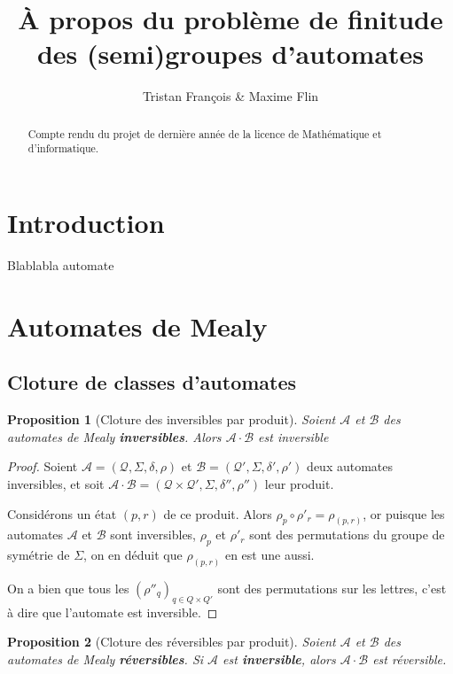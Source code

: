 \documentclass{article}
\title{À propos du problème de finitude des (semi)groupes d'automates}
\author{Tristan François \& Maxime Flin}
\newtheorem{prop}{Proposition}
\begin{document}
\maketitle

\begin{abstract}
  Compte rendu du projet de dernière année de la licence de Mathématique et d'informatique.
\end{abstract}


\section*{Introduction}
Blablabla automate

\section{Automates de Mealy}

\subsection{Cloture de classes d'automates}
\begin{prop}[Cloture des inversibles par produit]
  Soient $\mathcal{A}$ et $\mathcal{B}$ des automates de Mealy \textbf{inversibles}. Alors $\mathcal{A}\cdot\mathcal{B}$ est inversible
\end{prop}

\begin{proof}
  Soient $\mathcal{A}=\left(\mathcal{Q}, \Sigma, \delta, \rho\right)$ et $\mathcal{B}=\left(\mathcal{Q'}, \Sigma, \delta', \rho'\right)$ deux automates inversibles, et soit $\mathcal{A\cdot B}=\left(\mathcal{Q\times Q'}, \Sigma, \delta'', \rho''\right)$ leur produit.


  Considérons un état $(p, r)$ de ce produit. Alors $\rho_p\circ\rho'_r=\rho_{(p,r)}$, or puisque les automates $\mathcal{A}$ et $\mathcal{B}$ sont inversibles, $\rho_p$ et $\rho'_r$ sont des permutations du groupe de symétrie de $\Sigma$, on en déduit que $\rho_{(p, r)}$ en est une aussi.


  On a bien que tous les $(\rho''_q)_{q\in Q\times Q'}$ sont des permutations sur les lettres, c'est à dire que l'automate est inversible.
\end{proof}

\begin{prop}[Cloture des réversibles par produit]
  Soient $\mathcal{A}$ et $\mathcal{B}$ des automates de Mealy \textbf{réversibles}. Si $\mathcal{A}$ est \textbf{inversible}, alors $\mathcal{A}\cdot\mathcal{B}$ est réversible.
\end{prop}
\end{document}
